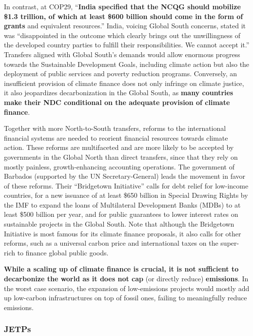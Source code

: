 \documentclass[12pt,english]{article}
\begin{document}
In contrast, at COP29, ``\textbf{India specified that the NCQG should mobilize \$1.3 trillion, of which at least \$600 billion should come in the form of grants} and equivalent resources.''\cite{earth_negotiations_bulletin_daily_2024} India, voicing Global South concerns, stated it was ``disappointed in the outcome which clearly brings out the unwillingness of the developed country parties to fulfill their responsibilities. We cannot accept it.'' Transfers aligned with Global South's demands would allow enormous progress towards the Sustainable Development Goals, including climate action but also the deployment of public services and poverty reduction programs. Conversely, an insufficient provision of climate finance does not only infringe on climate justice, it also jeopardizes decarbonization in the Global South, as \textbf{many countries make their NDC conditional on the adequate provision of climate finance}. 

Together with more North-to-South transfers, reforms to the international financial systems are needed to reorient financial resources towards climate action. These reforms are multifaceted and are more likely to be accepted by governments in the Global North than direct transfers, since that they rely on mostly painless, growth-enhancing accounting operations. The government of Barbados (supported by the UN Secretary-General) leads the movement in favor of these reforms. Their ``Bridgetown Initiative'' calls for debt relief for low-income countries, for a new issuance of at least \$650 billion in Special Drawing Rights by the IMF to expand the loans of Multilateral Development Banks (MDBs) to at least \$500 billion per year, and for public guarantees to lower interest rates on sustainable projects in the Global South.\cite{bridgetown_bridgetown_2025} Note that although the Bridgetown Initiative is most famous for its climate finance proposals, it also calls for other reforms, such as a universal carbon price and international taxes on the super-rich to finance global public goods. 

\textbf{While a scaling up of climate finance is crucial, it is not sufficient to decarbonize the world as it does not cap} (or directly reduce) \textbf{emissions}. In the worst case scenario, the expansion of low-emissions projects would mostly add up low-carbon infrastructures on top of fossil ones, failing to meaningfully reduce emissions.

\subsubsection{JETPs\label{subsubsec:jetp}}
\end{document}
